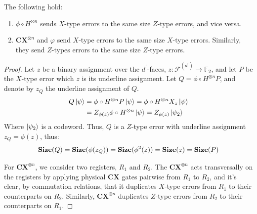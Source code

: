 \begin{claim}
  The following hold:
  \begin{enumerate}
    \item $ \phi \circ  H^{\otimes n} $ sends $X$-type errors to the same size $Z$-type errors, and vice versa.  
    \item  $\mathbf{CX}^{\otimes n}$ and $\varphi$ send $X$-type errors to the same size $X$-type errors. Similarly, they send $Z$-types errors to the same size $Z$-type errors.  
  \end{enumerate}
\end{claim}
\begin{proof}
  Let $z$ be a binary assignment over the $d^{\prime}$-faces, $z : \mathcal{F}^{(d^{\prime})} \rightarrow \mathbb{F}_{2}$, and let $P$ be the $X$-type error which $z$ is its underline assignment. Let $ Q = \phi \circ H^{\otimes n} P $, and denote by $z_{Q}$ the underline assignment of $Q$. 
\begin{equation*}
  \begin{split}
    Q \ket{\psi} & = \phi \circ H^{\otimes n} P \ket{\psi} = \phi \circ H^{\otimes n} X_{z} \ket{\psi} \\ 
    & = Z_{\phi (z)} \phi \circ H^{\otimes n} \ket{\psi} = Z_{\phi (z) } \ket{\psi_{2}} 
  \end{split}
\end{equation*}
Where $\ket{\psi_{2}}$ is a codeword. Thus, $Q$ is a $Z$-type error with underline assignment $z_{Q} = \phi(z)$, thus: 
\begin{equation*}
  \begin{split}
    \mathbf{Size}(Q) = \mathbf{Size}(\phi(z_{Q})) = \mathbf{Size}(\phi^{2}(z) ) = \mathbf{Size}(z) = \mathbf{Size}(P)
  \end{split}
\end{equation*}


For $\mathbf{CX}^{\otimes n}$, we consider two registers, $R_1$ and $R_2$. The $\mathbf{CX}^{\otimes n}$ acts transversally on the registers by applying physical $\mathbf{CX}$ gates pairwise from $R_1$ to $R_2$, and it's clear, by commutation relations, that it duplicates $X$-type errors from $R_1$ to their counterparts on $R_2$. Similarly, $\mathbf{CX}^{\otimes n}$ duplicates $Z$-type errors from $R_2$ to their counterparts on $R_1$.



\end{proof}

